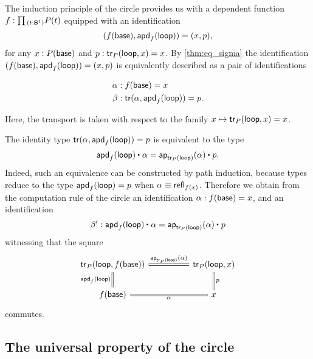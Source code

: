 \begin{rmk}
The induction principle of the circle provides us with a dependent function $f:\prd{t:\sphere{1}}P(t)$ equipped with an identification
\begin{equation*}
(f(\mathsf{base}),\mathsf{apd}_{f}\mathopen{}\left(\mathsf{loop}\right)\mathclose{})=(x,p),
\end{equation*}
for any $x : P(\mathsf{base})$ and $p : \mathsf{tr}_P(\mathsf{loop},x)=x$. By \cref{thm:eq_sigma} the identification
$(f(\mathsf{base}),\mathsf{apd}_{f}\mathopen{}\left(\mathsf{loop}\right)\mathclose{})=(x,p)$ is equivalently described as a pair of identifications
\begin{samepage}
\begin{align*}
\alpha & : f(\mathsf{base})= x \\
\beta & : \mathsf{tr}(\alpha,\mathsf{apd}_{f}\mathopen{}\left(\mathsf{loop}\right)\mathclose{}) = p.
\end{align*}\end{samepage}%
Here, the transport is taken with respect to the family $x\mapsto \mathsf{tr}_P(\mathsf{loop},x)=x$. 

The identity type $\mathsf{tr}(\alpha,\mathsf{apd}_{f}\mathopen{}\left(\mathsf{loop}\right)\mathclose{}) = p$ is equivalent to the type
\begin{equation*}
\ct{\apd{f}{\lloop}}{\alpha}=\ct{\mathsf{ap}_{\mathsf{tr}_P(\lloop)}(\alpha)}{p}.
\end{equation*}
Indeed, such an equivalence can be constructed by path induction, because types reduce to the type $\mathsf{apd}_{f}\mathopen{}\left(\mathsf{loop}\right)\mathclose{}=p$ when $\alpha\equiv\mathsf{refl}_{f(x)}$. Therefore we obtain from the computation rule of the circle an identification $\alpha:f(\mathsf{base})=x$, and an identification
\begin{equation*}
\beta':\ct{\apd{f}{\lloop}}{\alpha}=\ct{\mathsf{ap}_{\mathsf{tr}_P(\lloop)}(\alpha)}{p}
\end{equation*}
witnessing that the square
\begin{equation*}
\begin{tikzcd}[column sep=huge]
\mathsf{tr}_P(\lloop,f(\base)) \arrow[d,equals,swap,"\apd{f}{\lloop}"] \arrow[r,equals,"\ap{\mathsf{tr}_P(\lloop)}{\alpha}"] & \mathsf{tr}_P(\lloop,x) \arrow[d,equals,"p"] \\
f(\base) \arrow[r,equals,swap,"\alpha"] & x
\end{tikzcd}
\end{equation*}
commutes.
\end{rmk}

\subsection{The universal property of the circle}

